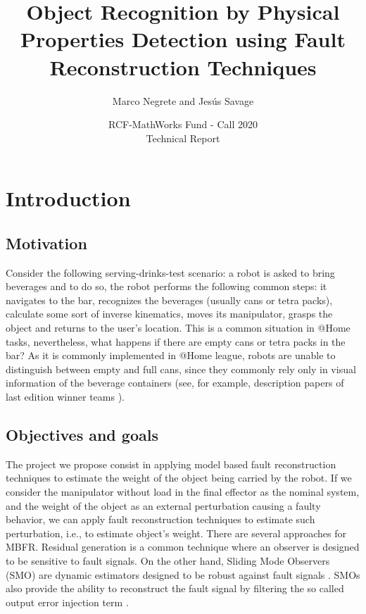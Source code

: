 \documentclass[a4paper, 10pt]{article}
\title{Object Recognition by Physical Properties Detection using Fault Reconstruction Techniques}
\author{Marco Negrete and Jesús Savage}
\date{RCF-MathWorks Fund - Call 2020\\Technical Report}
\begin{document}
\maketitle
\tableofcontents

\section{Introduction}
\subsection{Motivation}
Consider the following serving-drinks-test scenario: a robot is asked to bring beverages and to do so, the robot performs the following common steps: it navigates to the bar, recognizes the beverages (usually cans or tetra packs), calculate some sort of inverse kinematics, moves its manipulator, grasps the object and returns to the user's location. This is a common situation in @Home tasks, nevertheless, what happens if there are empty cans or tetra packs in the bar? As it is commonly implemented in @Home league, robots are unable to distinguish between empty and full cans, since they commonly rely only in visual information of the beverage containers (see, for example, description papers of last edition winner teams \cite{tdp2019Eindhoven, tdp2019Homer, tdp2019UTS}).
\subsection{Objectives and goals}
The project we propose consist in applying model based fault reconstruction techniques \cite{ding2013model} to estimate the weight of the object being carried by the robot. If we consider the manipulator without load in the final effector as the nominal system, and the weight of the object as an external perturbation causing a faulty behavior, we can apply fault reconstruction techniques to estimate such perturbation, i.e., to estimate object's weight. There are several approaches for MBFR. Residual generation is a common technique where an observer is designed to be sensitive to fault signals. On the other hand, Sliding Mode Observers (SMO) are dynamic estimators designed to be robust against fault signals \cite{shtessel2014sliding}. SMOs also provide the ability to reconstruct the fault signal by filtering the so called output error injection term \cite{alwi2011fault}.
\end{document}
